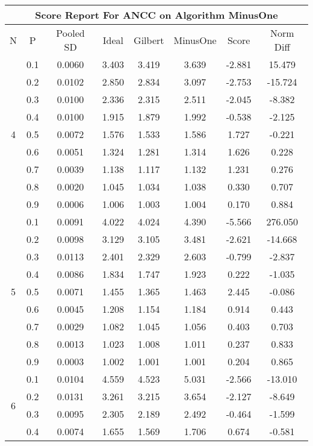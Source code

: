 \documentclass[11pt,a4paper]{report}
\begin{document}
\begin{longtable}{ | c | c || c | c | c | c | c | c | }
\hline
\multicolumn{8}{|c|}{ Score Report For ANCC on Algorithm MinusOne} \\
\hline
N & P & Pooled SD &  Ideal &  Gilbert & MinusOne  & Score & Norm Diff \\
 \hline
 \hline
 \endhead
\multirow{9}{*}{4} & 0.1 & 0.0060 & 3.403 & 3.419 & 3.639 & -2.881 & 15.479 \\
 & 0.2 & 0.0102 & 2.850 & 2.834 & 3.097 & -2.753 & -15.724 \\
 & 0.3 & 0.0100 & 2.336 & 2.315 & 2.511 & -2.045 & -8.382 \\
 & 0.4 & 0.0100 & 1.915 & 1.879 & 1.992 & -0.538 & -2.125 \\
 & 0.5 & 0.0072 & 1.576 & 1.533 & 1.586 & 1.727 & -0.221 \\
 & 0.6 & 0.0051 & 1.324 & 1.281 & 1.314 & 1.626 & 0.228 \\
 & 0.7 & 0.0039 & 1.138 & 1.117 & 1.132 & 1.231 & 0.276 \\
 & 0.8 & 0.0020 & 1.045 & 1.034 & 1.038 & 0.330 & 0.707 \\
 & 0.9 & 0.0006 & 1.006 & 1.003 & 1.004 & 0.170 & 0.884 \\
 \hline
\multirow{9}{*}{5} & 0.1 & 0.0091 & 4.022 & 4.024 & 4.390 & -5.566 & 276.050 \\
 & 0.2 & 0.0098 & 3.129 & 3.105 & 3.481 & -2.621 & -14.668 \\
 & 0.3 & 0.0113 & 2.401 & 2.329 & 2.603 & -0.799 & -2.837 \\
 & 0.4 & 0.0086 & 1.834 & 1.747 & 1.923 & 0.222 & -1.035 \\
 & 0.5 & 0.0071 & 1.455 & 1.365 & 1.463 & 2.445 & -0.086 \\
 & 0.6 & 0.0045 & 1.208 & 1.154 & 1.184 & 0.914 & 0.443 \\
 & 0.7 & 0.0029 & 1.082 & 1.045 & 1.056 & 0.403 & 0.703 \\
 & 0.8 & 0.0013 & 1.023 & 1.008 & 1.011 & 0.237 & 0.833 \\
 & 0.9 & 0.0003 & 1.002 & 1.001 & 1.001 & 0.204 & 0.865 \\
 \hline
\multirow{9}{*}{6} & 0.1 & 0.0104 & 4.559 & 4.523 & 5.031 & -2.566 & -13.010 \\
 & 0.2 & 0.0131 & 3.261 & 3.215 & 3.654 & -2.127 & -8.649 \\
 & 0.3 & 0.0095 & 2.305 & 2.189 & 2.492 & -0.464 & -1.599 \\
 & 0.4 & 0.0074 & 1.655 & 1.569 & 1.706 & 0.674 & -0.581 \\

\end{longtable}
\end{document}
